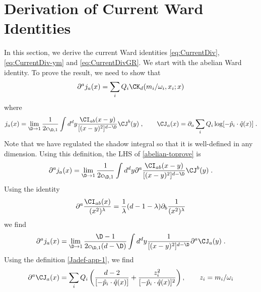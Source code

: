\documentclass[11pt]{article}
\def\l{{\lambda}}
\def\o{{\omega}}
\def\p{{\partial}}
\begin{document}
\appendix


\section{Derivation of Current Ward Identities}
\label{app:wardidderivation}


In this section, we derive the current Ward identities \eqref{eq:CurrentDiv}, \eqref{eq:CurrentDiv-ym} and \eqref{eq:CurrentDivGR}. We start with the abelian Ward identity. To prove the result, we need to show that
\begin{equation}
\begin{split}\label{abelian-toprove}
\p^a j_a(x) =  \sum_i Q_i \CK_d ( m_i / \o_i , x_i ; x )
\end{split}
\end{equation}
where
\begin{equation}
\begin{split}\label{Jadef-app-1}
j_a(x) = \lim_{\D \to 1 }  \frac{1}{2c_{\D,1}} \int d^d y \frac{\CI_{ab}(x-y)}{ [ ( x - y )^2 ]^{d-\D} } \CJ^b(y) \; ,  \qquad \CJ_a (x) = \p_a \sum_i Q_i \log [ - {\hat p}_i \cdot {\hat q}(x) ] \; . 
\end{split}
\end{equation}
Note that we have regulated the shadow integral so that it is well-defined in any dimension. Using this definition, the LHS of \eqref{abelian-toprove} is 
\begin{equation}
\begin{split}
\p^a j_a(x) =   \lim_{\D \to 1 } \frac{1}{2c_{\D,1}} \int d^d y \p^a \frac{\CI_{ab}(x-y)}{ [ ( x - y )^2 ]^{d-\D} } \CJ^b(y)  \; .
\end{split}
\end{equation}
Using the identity
\begin{equation}
\begin{split}
\p^a \frac{\CI_{ab}(x)}{ (x^2)^\l }  = \frac{1}{\l} ( d - 1 - \l ) \p_b \frac{1}{(x^2)^\l} 
\end{split}
\end{equation}
we find
\begin{equation}
\begin{split}
\p^a j_a(x) =  \lim_{\D \to 1 } \frac{\D-1}{2c_{\D,1}(d-\D)} \int d^d y  \frac{1}{ [ ( x - y )^2 ]^{d-\D} }  \p^a \CJ_a (y) \; .
\end{split}
\end{equation}
Using the definition \eqref{Jadef-app-1}, we find
\begin{equation}
\begin{split}
\p^a \CJ_a (x) =  \sum_i Q_i \left( \frac{d-2}{ [ - {\hat p}_i \cdot {\hat q}(x) ] }  +  \frac{ z_i^2 }{ [ - {\hat p}_i \cdot {\hat q}(x) ]^2 }  \right) , \qquad z_i = m_i / \o_i 
\end{split}
\end{equation}
\end{document}

